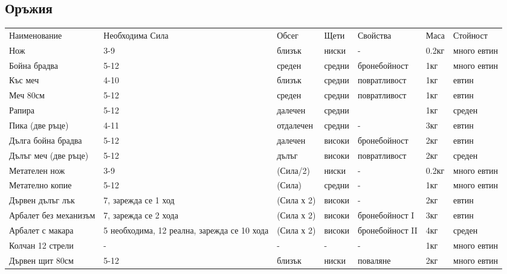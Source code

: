 \subsection{Оръжия}
\begin{tabular}{p{2cm} | p{2cm} | p{2cm} | p{2cm} | p{2cm} | p{2cm} | p{2cm}}
Наименование          & Необходима Сила      & Обсег      & Щети       & Свойства       & Маса  & Стойност     \\
Нож                   & 3-9                  & близък     & ниски      & -              & 0.2кг & много евтин  \\
Бойна брадва          & 5-12                 & среден     & средни     & бронебойност   & 1кг   & много евтин  \\
Къс меч               & 4-10                 & близък     & средни     & повратливост   & 1кг   & евтин        \\
Меч 80см              & 5-12                 & среден     & средни     & повратливост   & 1кг   & евтин        \\
Рапира                & 5-12                 & далечен    & средни     &                & 1кг   & среден       \\

Пика (две ръце)       & 4-11                 & отдалечен  & средни     & -              & 3кг   & евтин        \\
Дълга бойна брадва    & 5-12                 & далечен    & високи     & бронебойност   & 2кг   & евтин        \\
Дълъг меч (две ръце)  & 5-12                 & дълъг      & високи     & повратливост   & 2кг   & среден       \\

Метателен нож         & 3-9                  & (Сила/2)   & ниски      & -              & 0.2кг & много евтин  \\
Метателно копие       & 5-12                 & (Сила)     & средни     & -              & 1кг   & много евтин  \\
Дървен дълъг лък      & 7, зарежда се 1 ход  & (Сила х 2) & високи     & -              & 2кг   & евтин        \\
Арбалет без механизъм & 7, зарежда се 2 хода & (Сила х 2) & високи     & бронебойност I & 3кг   & евтин        \\
Арбалет с макара      & 5 необходима, 12 реална, зарежда се 10 хода & (Сила х 2) & високи & бронебойност II & 4кг & среден\\
Колчан 12 стрели      & -                    & -          & -          & -              & 1кг   & много евтин  \\

Дървен щит 80см       & 5-12                 & близък     & ниски      & поваляне       & 2кг   & много евтин  \\
\end{tabular}

